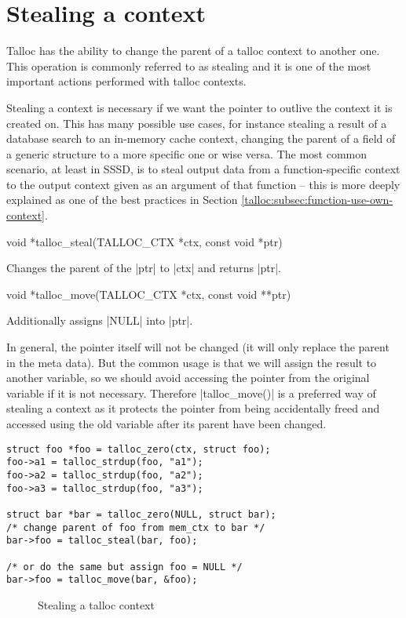 \section{Stealing a context}
\label{talloc:stealing}

Talloc has the ability to change the parent of a talloc context to another
one. This operation is commonly referred to as stealing and it is one of
the most important actions performed with talloc contexts.

Stealing a context is necessary if we want the pointer to outlive the context it
is created on. This has many possible use cases, for instance stealing a result
of a database search to an in-memory cache context, changing the parent of a
field of a generic structure to a more specific one or wise versa. The most
common scenario, at least in SSSD, is to steal output data from a function-specific
context to the output context given as an argument of that function -- this is
more deeply explained as one of the best practices in Section 
\ref{talloc:subsec:function-use-own-context}.

\begin{funcproto}
void *talloc_steal(TALLOC_CTX *ctx, const void *ptr)
\end{funcproto}
\begin{funcdesc}
  Changes the parent of the |ptr| to |ctx| and returns |ptr|.
\end{funcdesc}
\begin{funcproto}
void *talloc_move(TALLOC_CTX *ctx, const void **ptr)
\end{funcproto}
\begin{funcdesc}
  Additionally assigns |NULL| into |ptr|.
\end{funcdesc}
\funclistend
In general, the pointer itself will not be changed (it will only replace the
parent in the meta data). But the common usage is that we will assign the
result to another variable, so we should avoid accessing the pointer from the
original variable if it is not necessary. Therefore |talloc_move()| is a
preferred way of stealing a context as it protects the pointer from being
accidentally freed and accessed using the old variable after its parent have
been changed.

\begin{lstlisting}[caption={talloc_steal() and talloc_move()}]
struct foo *foo = talloc_zero(ctx, struct foo);
foo->a1 = talloc_strdup(foo, "a1");
foo->a2 = talloc_strdup(foo, "a2");
foo->a3 = talloc_strdup(foo, "a3");

struct bar *bar = talloc_zero(NULL, struct bar);
/* change parent of foo from mem_ctx to bar */
bar->foo = talloc_steal(bar, foo);

/* or do the same but assign foo = NULL */
bar->foo = talloc_move(bar, &foo);
\end{lstlisting}

\begin{figure}[H]
  \centering
  
  \caption{Stealing a talloc context}
  \label{fig:steal}
\end{figure}